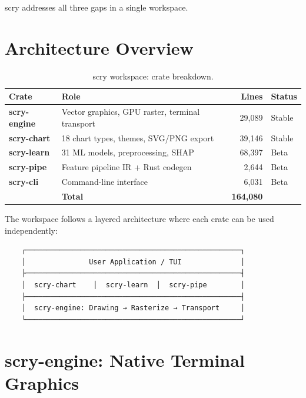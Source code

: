 \documentclass[11pt,a4paper]{article}
\begin{document}
scry addresses all three gaps in a single workspace.

\section{Architecture Overview}

\begin{table}[H]
\centering
\caption{scry workspace: crate breakdown.}
\label{tab:crates}
\begin{tabular}{llrl}
\toprule
\textbf{Crate} & \textbf{Role} & \textbf{Lines} & \textbf{Status} \\
\midrule
\textcolor{prismblue}{\textbf{scry-engine}} & Vector graphics, GPU raster, terminal transport & 29,089 & Stable \\
\textcolor{prismgreen}{\textbf{scry-chart}} & 18 chart types, themes, SVG/PNG export & 39,146 & Stable \\
\textcolor{prismviolet}{\textbf{scry-learn}} & 31 ML models, preprocessing, SHAP & 68,397 & Beta \\
\textcolor{prismorange}{\textbf{scry-pipe}} & Feature pipeline IR + Rust codegen & 2,644 & Beta \\
\textcolor{prismred}{\textbf{scry-cli}} & Command-line interface & 6,031 & Beta \\
\midrule
& \textbf{Total} & \textbf{164,080} & \\
\bottomrule
\end{tabular}
\end{table}

The workspace follows a layered architecture where each crate can be
used independently:

\begin{verbatim}
    ┌───────────────────────────────────────────────────┐
    │               User Application / TUI              │
    ├───────────────────────────────────────────────────┤
    │  scry-chart    │  scry-learn  │  scry-pipe        │
    ├───────────────────────────────────────────────────┤
    │  scry-engine: Drawing → Rasterize → Transport     │
    └───────────────────────────────────────────────────┘
\end{verbatim}

\section{scry-engine: Native Terminal Graphics}
\end{document}
